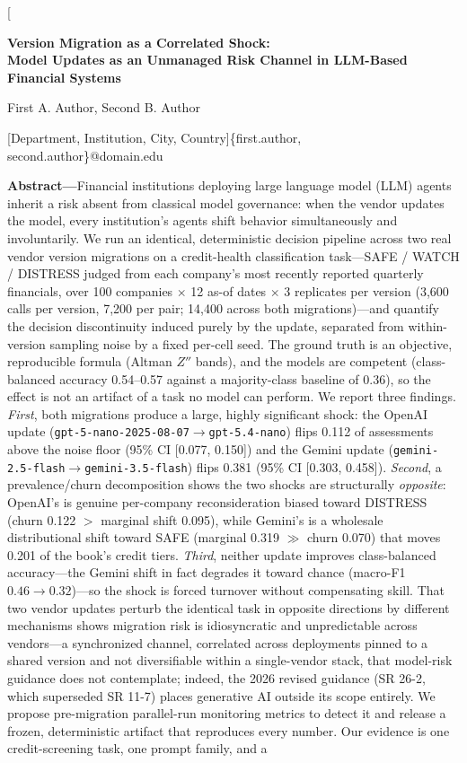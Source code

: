 \documentclass[10pt,twocolumn]{article}
\begin{document}
\twocolumn[{%
\centering
{\LARGE\bfseries Version Migration as a Correlated Shock:\\[3pt]
Model Updates as an Unmanaged Risk Channel in LLM-Based Financial Systems\par}
\vspace{0.9em}
{\normalsize First A. Author, \quad Second B. Author\par}
{\small [Department, Institution, City, Country]\quad \{first.author, second.author\}@domain.edu\par}
\vspace{1.0em}
\parbox{0.93\textwidth}{%
\small\textbf{Abstract---}Financial institutions deploying large language model (LLM) agents inherit a risk absent from classical model governance: when the vendor updates the model, every institution's agents shift behavior simultaneously and involuntarily. We run an identical, deterministic decision pipeline across two real vendor version migrations on a credit-health classification task---SAFE / WATCH / DISTRESS judged from each company's most recently reported quarterly financials, over 100 companies $\times$ 12 as-of dates $\times$ 3 replicates per version (3{,}600 calls per version, 7{,}200 per pair; 14{,}400 across both migrations)---and quantify the decision discontinuity induced purely by the update, separated from within-version sampling noise by a fixed per-cell seed. The ground truth is an objective, reproducible formula (Altman $Z''$ bands), and the models are competent (class-balanced accuracy 0.54--0.57 against a majority-class baseline of 0.36), so the effect is not an artifact of a task no model can perform. We report three findings. \emph{First}, both migrations produce a large, highly significant shock: the OpenAI update (\texttt{gpt-5-nano-2025-08-07}$\to$\texttt{gpt-5.4-nano}) flips 0.112 of assessments above the noise floor (95\% CI [0.077, 0.150]) and the Gemini update (\texttt{gemini-2.5-flash}$\to$\texttt{gemini-3.5-flash}) flips 0.381 (95\% CI [0.303, 0.458]). \emph{Second}, a prevalence/churn decomposition shows the two shocks are structurally \emph{opposite}: OpenAI's is genuine per-company reconsideration biased toward DISTRESS (churn 0.122 $>$ marginal shift 0.095), while Gemini's is a wholesale distributional shift toward SAFE (marginal 0.319 $\gg$ churn 0.070) that moves 0.201 of the book's credit tiers. \emph{Third}, neither update improves class-balanced accuracy---the Gemini shift in fact degrades it toward chance (macro-F1 $0.46\to0.32$)---so the shock is forced turnover without compensating skill. That two vendor updates perturb the identical task in opposite directions by different mechanisms shows migration risk is idiosyncratic and unpredictable across vendors---a synchronized channel, correlated across deployments pinned to a shared version and not diversifiable within a single-vendor stack, that model-risk guidance does not contemplate; indeed, the 2026 revised guidance (SR 26-2, which superseded SR 11-7) places generative AI outside its scope entirely. We propose pre-migration parallel-run monitoring metrics to detect it and release a frozen, deterministic artifact that reproduces every number. Our evidence is one credit-screening task, one prompt family, and a }}
\end{document}
